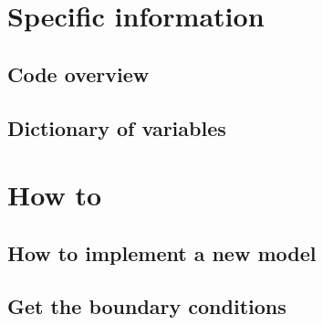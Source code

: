 \documentclass[openany]{book}
\begin{document}






\part{Specific information}

% 
\chapter{Code overview}


% 
\chapter{Dictionary of variables \label{ch:dictionary}}


% 
%


\part{How to}
\chapter{How to implement a new model}


\chapter{Get the boundary conditions}

\end{document}
